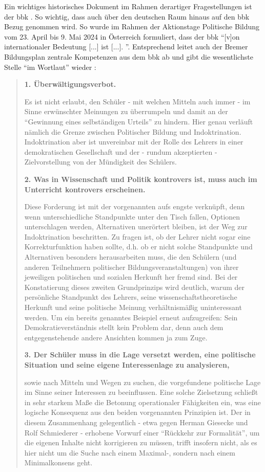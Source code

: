 Ein wichtiges historisches Dokument im Rahmen derartiger Fragestellungen ist der \Acrlong{bbk} \autocites[29]{Gesner2016}{Wehling1977}. So wichtig, dass auch über den deutschen Raum hinaus auf den \gls{bbk} Bezug genommen wird. So wurde im Rahmen der Aktionstage Politische Bildung vom 23. April bis 9. Mai 2024 in Österreich formuliert, dass der \gls{bbk} \enquote{[v]on internationaler Bedeutung [...] ist [...]. \autocite{bbkÖsterreich2023}}. Entsprechend leitet auch der Bremer Bildungsplan zentrale Kompetenzen aus dem \gls{bbk} ab und gibt die wesentlichste Stelle \enquote{im Wortlaut} wieder \autocite[11-12]{bplan}: 
\begin{quote}
    \textbf{1. Überwältigungsverbot.}

    Es ist nicht erlaubt, den Schüler - mit welchen Mitteln auch immer - im Sinne erwünschter Meinungen zu überrumpeln und damit an der \enquote{Gewinnung eines selbständigen Urteils} zu hindern. Hier genau verläuft nämlich die Grenze zwischen Politischer Bildung und Indoktrination. Indoktrination aber ist unvereinbar mit der Rolle des Lehrers in einer demokratischen Gesellschaft und der - rundum akzeptierten - Zielvorstellung von der Mündigkeit des Schülers. 

    \textbf{2. Was in Wissenschaft und Politik kontrovers ist, muss auch im Unterricht kontrovers erscheinen.}

    Diese Forderung ist mit der vorgenannten aufs engste verknüpft, denn wenn unterschiedliche Standpunkte unter den Tisch fallen, Optionen unterschlagen werden, Alternativen unerörtert bleiben, ist der Weg zur Indoktrination beschritten. Zu fragen ist, ob der Lehrer nicht sogar eine Korrekturfunktion haben sollte, d.h. ob er nicht solche Standpunkte und Alternativen besonders herausarbeiten muss, die den Schülern (und anderen Teilnehmern politischer Bildungsveranstaltungen) von ihrer jeweiligen politischen und sozialen Herkunft her fremd sind. Bei der Konstatierung dieses zweiten Grundprinzips wird deutlich, warum der persönliche Standpunkt des Lehrers, seine wissenschaftstheoretische Herkunft und seine politische Meinung verhältnismäßig uninteressant werden. Um ein bereits genanntes Beispiel erneut aufzugreifen: Sein Demokratieverständnis stellt kein Problem dar, denn auch dem entgegenstehende andere Ansichten kommen ja zum Zuge. 
    
    \textbf{3. Der Schüler muss in die Lage versetzt werden, eine politische Situation und seine eigene Interessenlage zu analysieren,} 

    sowie nach Mitteln und Wegen zu suchen, die vorgefundene politische Lage im Sinne seiner Interessen zu beeinflussen. Eine solche Zielsetzung schließt in sehr starkem Maße die Betonung operationaler Fähigkeiten ein, was eine logische Konsequenz aus den beiden vorgenannten Prinzipien ist. Der in diesem Zusammenhang gelegentlich - etwa gegen Herman Giesecke und Rolf Schmiederer - erhobene Vorwurf einer \enquote{Rückkehr zur Formalität}, um die eigenen Inhalte nicht korrigieren zu müssen, trifft insofern nicht, als es hier nicht um die Suche nach einem Maximal-, sondern nach einem Minimalkonsens geht. 
    

\end{quote}
